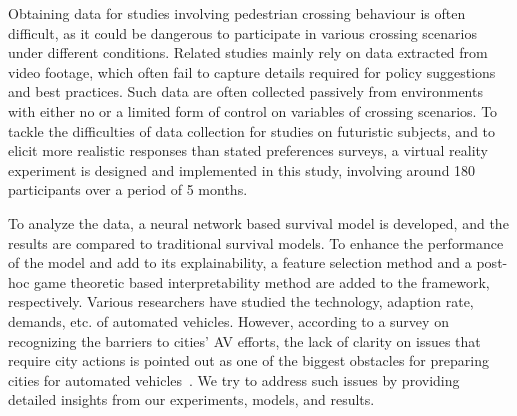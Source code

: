 Obtaining data for studies involving pedestrian crossing behaviour is often difficult, as it could be dangerous to participate in various crossing scenarios under different conditions. Related studies mainly rely on data extracted from video footage, which often fail to capture details required for policy suggestions and best practices. Such data are often collected passively from environments with either no or a limited form of control on variables of crossing scenarios. To tackle the difficulties of data collection for studies on futuristic subjects, and to elicit more realistic responses than stated preferences surveys, a virtual reality experiment is designed and implemented in this study, involving around 180 participants over a period of 5 months. 

To analyze the data, a neural network based survival model is developed, and the results are compared to traditional survival models. To enhance the performance of the model and add to its explainability, a feature selection method and a post-hoc game theoretic based interpretability method are added to the framework, respectively. Various researchers have studied the technology, adaption rate, demands, etc. of automated vehicles. However, according to a survey on recognizing the barriers to cities' AV efforts, the lack of clarity on issues that require city actions is pointed out as one of the biggest obstacles for preparing cities for automated vehicles~\citep{kinaSUR}. We try to address such issues by providing detailed insights from our experiments, models, and results.

